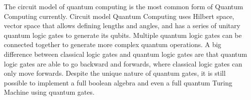 \documentclass[sigconf]{acmart}
\begin{document}
The circuit model of quantum computing is the most common form of Quantum Computing currently. Circuit model Quantum Computing uses Hilbert space, vector space that allows defining lengths and angles, and has a series of unitary quantum logic gates to generate its qubits. Multiple quantum logic gates can be connected together to generate more complex quantum operations. A big difference between classical logic gates and quantum logic gates are that quantum logic gates are able to go backward and forwards, where classical logic gates can only move forwards. Despite the unique nature of quantum gates, it is still possible to implement a full boolean algebra and even a full quantum Turing Machine using quantum gates\cite{rieffel_introduction_1998}.

\end{document}
